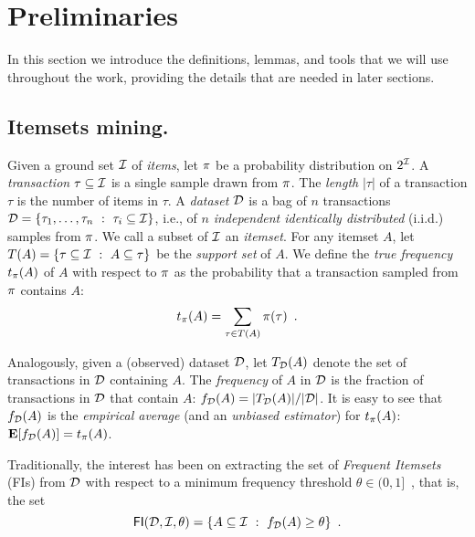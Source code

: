 \section{Preliminaries}\label{sec:prelims}
In this section we introduce the
definitions, lemmas, and tools that we will use throughout the work, providing the details that are
needed in later sections.

\subsection{Itemsets mining.}\label{sec:itemdef}
Given a ground set ${\cal I}$ of \emph{items}, let $\pi$ be a
probability distribution on $2^{{\cal I}}$. A \emph{transaction} $\tau\subseteq{\cal I}$
is a single sample drawn from $\pi$. The \emph{length} $|\tau|$ of
a transaction $\tau$ is the number of items in $\tau$.
A \emph{dataset}
${\cal D}$ is a bag of $n$ transactions ${\cal D}=\{\tau_1,\dots,\tau_n ~:~
\tau_i\subseteq{\cal I}\}$, i.e., of $n$
\emph{independent identically distributed} (i.i.d.) samples from $\pi$. We
call a subset of ${\cal I}$ an \emph{itemset}. For any itemset $A$, let
$T(A)=\{\tau\subseteq{\cal I} ~:~ A\subseteq \tau\}$ be the \emph{support set}
of $A$. %
We define the
\emph{true frequency} $t_\pi(A)$ of $A$ with respect to $\pi$ as the
probability that a transaction sampled from $\pi$ contains $A$:
\[
t_\pi(A) = \sum_{\tau\in T(A)}\pi(\tau)\enspace.
\]


Analogously, given a (observed) dataset ${\cal D}$, let $T_{\cal D}(A)$ denote
the set of transactions in ${\cal D}$ containing $A$. The \emph{frequency} of $A$
in ${\cal D}$ is the fraction of transactions in ${\cal D}$ that contain $A$: $f_{\cal D}(A)=
|T_{\cal D}(A)|/|{\cal D}|$. It is easy to see that $f_{\cal D}(A)$ is the
\emph{empirical average} (and an \emph{unbiased estimator}) for $t_\pi(A)$:
${\mathbf E}[f_{\cal D}(A)]=t_\pi(A)$.

Traditionally, the interest has been on extracting the set
of \emph{Frequent Itemsets} (FIs) from ${\cal D}$ with respect to a minimum frequency
threshold $\theta\in(0,1]$~\citep{AgrawalIS93}, that is, the set 
\[
\mathsf{FI}({\cal D},{\cal I},\theta)=\{A\subseteq{\cal I} ~:~ f_{\cal D}(A)\ge\theta\}\enspace.\]


